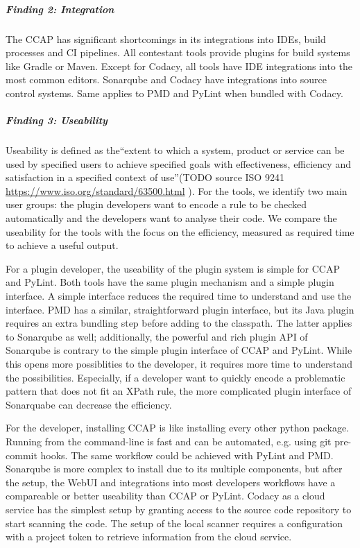 \subparagraph{Finding 2: Integration}
The CCAP has significant shortcomings in its integrations into IDEs, build processes and CI pipelines. All contestant tools provide plugins for build systems like Gradle or Maven. Except for Codacy, all tools have IDE integrations into the most common editors. Sonarqube and Codacy have integrations into source control systems. Same applies to PMD and PyLint when bundled with Codacy.

\subparagraph{Finding 3: Useability}
Useability is defined as the\enquote{extent to which a system, product or service can be used by specified users to achieve specified goals with effectiveness, efficiency and satisfaction in a specified context of use}(TODO source ISO 9241 \url{https://www.iso.org/standard/63500.html} ). For the tools, we identify two main user groups: the plugin developers want to encode a rule to be checked automatically and the developers want to analyse their code. We compare the useability for the tools with the focus on the efficiency, measured as required time to achieve a useful output.

For a plugin developer, the useability of the plugin system is simple for CCAP and PyLint. Both tools have the same plugin mechanism and a simple plugin interface. A simple interface reduces the required time to understand and use the interface.
PMD has a similar, straightforward plugin interface, but its Java plugin requires an extra bundling step before adding to the classpath. The latter applies to Sonarqube as well; additionally, the powerful and rich plugin API of Sonarqube is contrary to the simple plugin interface of CCAP and PyLint. While this opens more possiblities to the developer, it requires more time to understand the possibilities. Especially, if a developer want to quickly encode a problematic pattern that does not fit an XPath rule, the more complicated plugin interface of Sonarquabe can decrease the efficiency. 

For the developer, installing CCAP is like installing every other python package. Running from the command-line is fast and can be automated, e.g. using git pre-commit hooks. The same workflow could be achieved with PyLint and PMD. Sonarqube is more complex to install due to its multiple components, but after the setup, the WebUI and integrations into most developers workflows have a compareable or better useability than CCAP or PyLint. Codacy as a cloud service has the simplest setup by granting access to the source code repository to start scanning the code. The setup of the local scanner requires a configuration with a project token to retrieve information from the cloud service.

